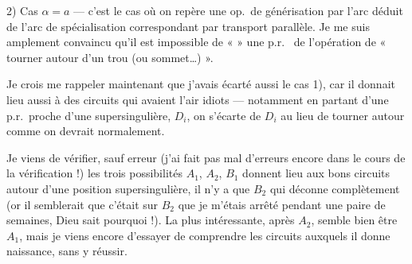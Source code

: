 \documentclass[11pt,a4paper]{article}
\begin{document}
2) Cas $\alpha = a$ --- c'est le cas  où on repère une op.\ de générisation par l'arc \supplied{(}déduit de l'arc de spécialisation correspondant par transport parallèle. Je me suis amplement convaincu qu'il est impossible de «  » une p.r.\  de l'opération \struck{\ill{}} de « tourner autour d'un trou (ou sommet\ldots) ».

Je crois me rappeler maintenant que j'avais écarté aussi le cas 1), car il donnait lieu aussi à des circuits qui avaient l'air idiots --- notamment en partant d'une p.r.\ proche d'une supersingulière, $D_i$, on s'écarte de $D_i$ au lieu de tourner autour comme on devrait normalement.



Je viens de vérifier, sauf erreur (j'ai fait pas mal d'erreurs encore dans le cours de la vérification !) les trois possibilités $A_1$, $A_2$, $B_1$ donnent lieu aux bons circuits autour d'une position supersingulière, il n'y a que $B_2$ qui déconne complètement (or il semblerait que c'était sur $B_2$ que je m'étais arrêté pendant une paire de semaines, Dieu sait pourquoi !). La plus intéressante, après $A_2$, semble bien être $A_1$, mais je viens encore d'essayer de comprendre les circuits auxquels il donne naissance, sans y réussir.
\end{document}
